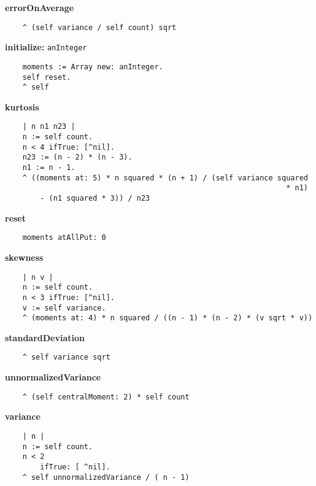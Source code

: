 {\bf errorOnAverage}
\begin{verbatim}
    ^ (self variance / self count) sqrt
\end{verbatim}
{\bf initialize:} {\tt anInteger}
\begin{verbatim}
    moments := Array new: anInteger.
    self reset.
    ^ self
\end{verbatim}
{\bf kurtosis}
\begin{verbatim}
    | n n1 n23 |
    n := self count.
    n < 4 ifTrue: [^nil].
    n23 := (n - 2) * (n - 3).
    n1 := n - 1.
    ^ ((moments at: 5) * n squared * (n + 1) / (self variance squared 
                                                                * n1) 
        - (n1 squared * 3)) / n23
\end{verbatim}
{\bf reset}
\begin{verbatim}
    moments atAllPut: 0
\end{verbatim}
{\bf skewness}
\begin{verbatim}
    | n v |
    n := self count.
    n < 3 ifTrue: [^nil].
    v := self variance.
    ^ (moments at: 4) * n squared / ((n - 1) * (n - 2) * (v sqrt * v))
\end{verbatim}
{\bf standardDeviation}
\begin{verbatim}
    ^ self variance sqrt
\end{verbatim}
{\bf unnormalizedVariance}
\begin{verbatim}
    ^ (self centralMoment: 2) * self count
\end{verbatim}
{\bf variance}
\begin{verbatim}
    | n |
    n := self count.
    n < 2
        ifTrue: [ ^nil].
    ^ self unnormalizedVariance / ( n - 1)
\end{verbatim}
